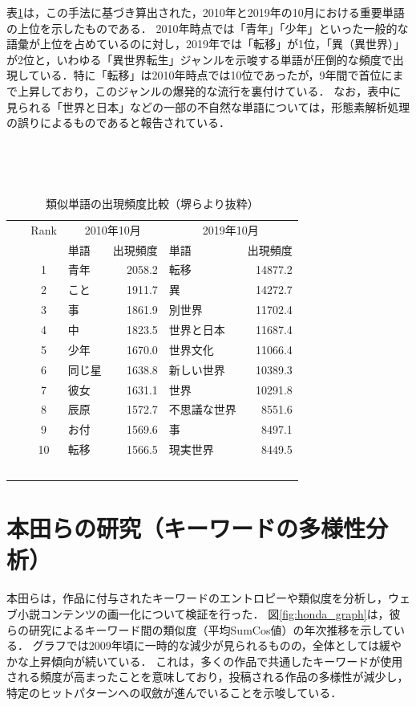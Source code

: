 \documentclass[uplatex, dvipdfmx, 11pt, a4paper, report]{jsbook}
\begin{document}
表\ref{tab:sakai_comparison}は，この手法に基づき算出された，2010年と2019年の10月における重要単語の上位を示したものである．
2010年時点では「青年」「少年」といった一般的な語彙が上位を占めているのに対し，2019年では「転移」が1位，「異（異世界）」が2位と，いわゆる「異世界転生」ジャンルを示唆する単語が圧倒的な頻度で出現している．特に「転移」は2010年時点では10位であったが，9年間で首位にまで上昇しており，このジャンルの爆発的な流行を裏付けている．
なお，表中に見られる「世界と日本」などの一部の不自然な単語については，形態素解析処理の誤りによるものであると報告されている．

\clearpage
\begin{table}[H]
  \centering
  \caption{類似単語の出現頻度比較（堺ら\cite{sakai}より抜粋）}
  \label{tab:sakai_comparison}
  \begin{tabular}{c|lr|lr} \hline
    Rank & \multicolumn{2}{c|}{2010年10月} & \multicolumn{2}{c}{2019年10月} \\
    & 単語 & 出現頻度 & 単語 & 出現頻度 \\ \hline
    1 & 青年 & 2058.2 & 転移 & 14877.2 \\
    2 & こと & 1911.7 & 異 & 14272.7 \\
    3 & 事 & 1861.9 & 別世界 & 11702.4 \\
    4 & 中 & 1823.5 & 世界と日本 & 11687.4 \\
    5 & 少年 & 1670.0 & 世界文化 & 11066.4 \\
    6 & 同じ星 & 1638.8 & 新しい世界 & 10389.3 \\
    7 & 彼女 & 1631.1 & 世界 & 10291.8 \\
    8 & 辰原 & 1572.7 & 不思議な世界 & 8551.6 \\
    9 & お付 & 1569.6 & 事 & 8497.1 \\
    10 & 転移 & 1566.5 & 現実世界 & 8449.5 \\ \hline
  \end{tabular}
\end{table}

\section{本田らの研究（キーワードの多様性分析）}
本田ら\cite{honda}は，作品に付与されたキーワードのエントロピーや類似度を分析し，ウェブ小説コンテンツの画一化について検証を行った．
図\ref{fig:honda_graph}は，彼らの研究によるキーワード間の類似度（平均SumCos値）の年次推移を示している．
グラフでは2009年頃に一時的な減少が見られるものの，全体としては緩やかな上昇傾向が続いている．
これは，多くの作品で共通したキーワードが使用される頻度が高まったことを意味しており，投稿される作品の多様性が減少し，特定のヒットパターンへの収斂が進んでいることを示唆している．
\end{document}
